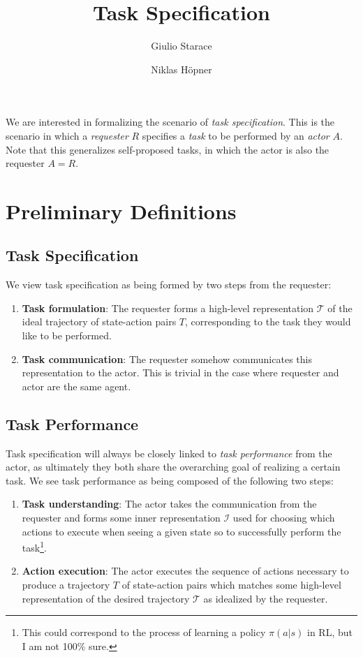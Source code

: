 \documentclass{article}
\title{Task Specification}
\author{Giulio Starace \and Niklas Höpner}
\begin{document}
 \maketitle

We are interested in formalizing the scenario of \textit{task specification}. This is the scenario
in which a \textit{requester} $R$ specifies a \textit{task} to be performed by an \textit{actor} $A$.
Note that this generalizes self-proposed tasks, in which the actor is also the requester $A=R$.

\section{Preliminary Definitions}

\subsection{Task Specification}

We view task specification as being formed by two steps from the requester:
\begin{enumerate}
	\item \textbf{Task formulation}: The requester forms a high-level representation $\mathcal{T}$ of
	      the ideal trajectory of state-action pairs $T$, corresponding to the task they would like to be
	      performed.
	\item \textbf{Task communication}: The requester somehow communicates this representation to the
	      actor. This is trivial in the case where requester and actor are the same agent.
\end{enumerate}

\subsection{Task Performance}

Task specification will always be closely linked to \textit{task performance} from the actor, as
ultimately they both share the overarching goal of realizing a certain task. We see task performance
as being composed of the following two steps:

\begin{enumerate}
	\item \textbf{Task understanding}: The actor takes the communication from the requester and forms
	      some inner representation $\mathcal{I}$ used for choosing which actions to execute when seeing
	      a given state so to successfully perform the task\footnote{This could correspond to the process
		      of learning a policy $\pi(a|s)$ in RL, but I am not 100\% sure.}.
	\item \textbf{Action execution}: The actor executes the sequence of actions necessary to produce
	      a trajectory $T$ of state-action pairs which matches some high-level representation of the
	      desired trajectory $\mathcal{T}$ as idealized by the requester.
\end{enumerate}
\end{document}
